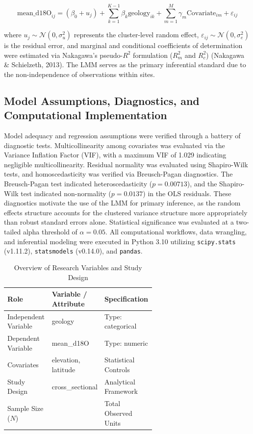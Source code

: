 \documentclass[sn-basic,Numbered]{sn-jnl}%
\begin{document}
\[
\text{mean\_d18O}_{ij} = (\beta_0 + u_j) + \sum_{k=1}^{K-1} \beta_k \text{geology}_{ik} + \sum_{m=1}^{M} \gamma_m \text{Covariate}_{im} + \varepsilon_{ij}
\]

where $u_j \sim \mathcal{N}(0, \sigma_u^2)$ represents the cluster-level random effect, $\varepsilon_{ij} \sim \mathcal{N}(0, \sigma_e^2)$ is the residual error, and marginal and conditional coefficients of determination were estimated via Nakagawa's pseudo-$R^2$ formulation ($R^2_m$ and $R^2_c$) (Nakagawa \& Schielzeth, 2013). The LMM serves as the primary inferential standard due to the non-independence of observations within sites.

\subsection{Model Assumptions, Diagnostics, and Computational Implementation}

Model adequacy and regression assumptions were verified through a battery of diagnostic tests. Multicollinearity among covariates was evaluated via the Variance Inflation Factor (VIF), with a maximum VIF of 1.029 indicating negligible multicollinearity. Residual normality was evaluated using Shapiro-Wilk tests, and homoscedasticity was verified via Breusch-Pagan diagnostics. The Breusch-Pagan test indicated heteroscedasticity ($p = 0.00713$), and the Shapiro-Wilk test indicated non-normality ($p = 0.0137$) in the OLS residuals. These diagnostics motivate the use of the LMM for primary inference, as the random effects structure accounts for the clustered variance structure more appropriately than robust standard errors alone. Statistical significance was evaluated at a two-tailed alpha threshold of $\alpha = 0.05$. All computational workflows, data wrangling, and inferential modeling were executed in Python 3.10 utilizing \texttt{scipy.stats} (v1.11.2), \texttt{statsmodels} (v0.14.0), and \texttt{pandas}.

\begin{table}[htbp]
\centering
\caption{Overview of Research Variables and Study Design}
\label{tab:variables_summary}
\small
\begin{tabularx}{\linewidth}{@{} >{\raggedright\arraybackslash}p{0.30\linewidth} >{\raggedright\arraybackslash}p{0.30\linewidth} X @{}}
\toprule
\textbf{Role} & \textbf{Variable / Attribute} & \textbf{Specification} \\
\midrule
  Independent Variable & geology & Type: categorical \\
  Dependent Variable & mean\_d18O & Type: numeric \\
  Covariates & elevation, latitude & Statistical Controls \\
  Study Design & cross\_sectional & Analytical Framework \\
  Sample Size ($N$) & 542 & Total Observed Units \\
\bottomrule
\end{tabularx}
\end{table}
\end{document}
